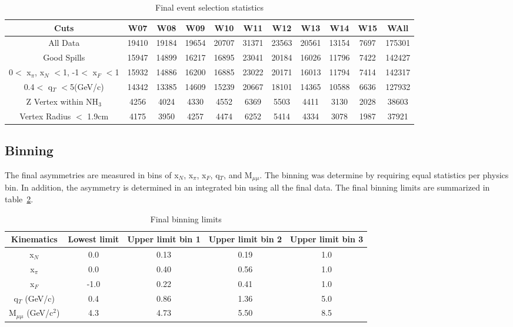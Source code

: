 \begin{table}[h!t]
  \centering
  \begin{tabular}{ |c|c|c|c|c|c|c|c|c|c|c| }
    \hline \textbf{Cuts}& \textbf{W07}& \textbf{W08}& \textbf{W09}&
    \textbf{W10}& \textbf{W11}& \textbf{W12}& \textbf{W13}& \textbf{W14}&
    \textbf{W15} & \textbf{WAll} \\ \hline

    All Data& 19410& 19184& 19654& 20707& 31371& 23563& 20561& 13154& 7697&
    175301 \\ \hline
    
    Good Spills& 15947& 14899& 16217& 16895& 23041& 20184& 16026& 11796& 7422&
    142427 \\ \hline

    0$<$ x$_{\pi}$, x$_N$ $<$1, -1$<$ x$_F$ $<$1& 15932& 14886& 16200& 16885&
    23022& 20171& 16013& 11794& 7414& 142317 \\ \hline

    0.4$<$ q$_T$ $<$5(GeV/c)& 14342& 13385& 14609& 15239& 20667& 18101& 14365&
    10588& 6636& 127932 \\ \hline

    Z Vertex within NH$_3$& 4256& 4024& 4330& 4552& 6369& 5503& 4411& 3130&
    2028& 38603 \\ \hline

    Vertex Radius $<$ 1.9cm& 4175& 3950& 4257& 4474& 6252& 5414& 4334& 3078&
    1987& 37921 \\ \hline
    
  \end{tabular}
  \caption{Final event selection statistics}
  \label{tab::EventTable}
\end{table}

\subsection{Binning}
The final asymmetries are measured in bins of x$_N$, x$_{\pi}$, x$_F$, q$_T$,
and M$_{\mu\mu}$.  The binning was determine by requiring equal statistics per
physics bin.  In addition, the asymmetry is determined in an integrated bin
using all the final data.  The final binning limits are summarized in
table~\ref{tab::binning}.

\begin{table}[h!t]
  \centering
  \begin{tabular}{ |c|c|c|c|c| }
    \hline \textbf{Kinematics}& \textbf{Lowest limit}& \textbf{Upper limit bin
      1}& \textbf{Upper limit bin 2}& \textbf{Upper limit bin 3}\\ \hline
    
    x$_N$& 0.0& 0.13& 0.19& 1.0\\ \hline x$_{\pi}$& 0.0& 0.40& 0.56&
    1.0\\ \hline x$_F$& -1.0& 0.22& 0.41& 1.0\\ \hline q$_T$ (GeV/c)& 0.4& 0.86&
    1.36& 5.0\\ \hline M$_{\mu\mu}$ (GeV/c$^2$)& 4.3& 4.73& 5.50& 8.5 \\ \hline
    
  \end{tabular}
  \caption{Final binning limits}
  \label{tab::binning}
\end{table}


